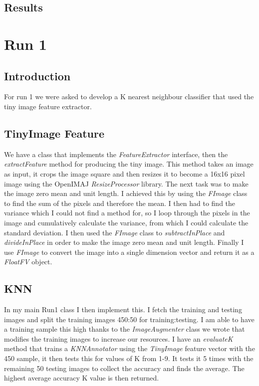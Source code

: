 \documentclass{article}
\begin{document}
	
	\subsection{Results}
	
	\section{Run 1}
	
	\subsection{Introduction}
	For run 1 we were asked to develop a K nearest neighbour classifier that used the tiny image feature extractor.
	\subsection{TinyImage Feature}
	We have a class that implements the \textit{FeatureExtractor} interface, then the \textit{extractFeature} method for producing the tiny image.
	This method takes an image as input, it crops the image square and then resizes it to become a 16x16 pixel image using the OpenIMAJ \textit{ResizeProcessor} library.
	The next task was to make the image zero mean and unit length. I achieved this by using the \textit{FImage} class to find the sum of the pixels and therefore the mean. I then had to find the variance which I could not find a method for, so I loop through the pixels in the image and cumulatively calculate the variance, from which I could calculate the standard deviation.
	I then used the \textit{FImage} class to \textit{subtractInPlace} and \textit{divideInPlace} in order to make the image zero mean and unit length. Finally I use \textit{FImage} to convert the image into a single dimension vector and return it as a \textit{FloatFV} object.
	\subsection{KNN}
	In my main Run1 class I then implement this. I fetch the training and testing images and split the training images 450:50 for training:testing. I am able to have a training sample this high thanks to the \textit{ImageAugmenter} class we wrote that modifies the training images to increase our resources.
	I have an \textit{evaluateK} method that trains a \textit{KNNAnnotator} using the \textit{TinyImage} feature vector with the 450 sample, it then tests this for values of K from 1-9. It tests it 5 times with the remaining 50 testing images to collect the accuracy and finds the average. The highest average accuracy K value is then returned.
	\newline
	
\end{document}
